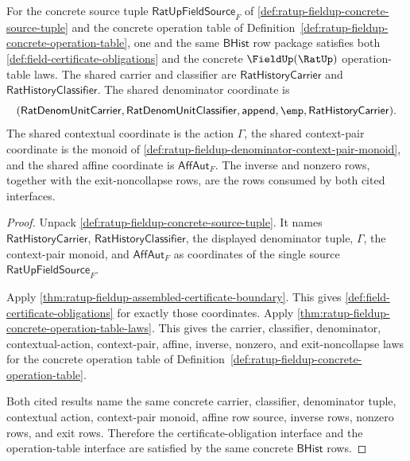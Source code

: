 \begin{theorem}
\label{thm:ratup-fieldup-assembled-certificate-operation-table-coverage}
For the concrete source tuple $\mathsf{RatUpFieldSource}_F$ of
\autoref{def:ratup-fieldup-concrete-source-tuple} and the concrete operation
table of Definition~\ref{def:ratup-fieldup-concrete-operation-table}, one and
the same $\mathsf{BHist}$ row package satisfies both
\autoref{def:field-certificate-obligations} and the concrete
$\FieldUp(\RatUp)$ operation-table laws. The shared carrier and classifier are
$\mathsf{RatHistoryCarrier}$ and $\mathsf{RatHistoryClassifier}$. The shared
denominator coordinate is
$$
(\mathsf{RatDenomUnitCarrier},\mathsf{RatDenomUnitClassifier},
\mathsf{append},\emp,\mathsf{RatHistoryCarrier}).
$$
The shared contextual coordinate is the action $\Gamma$, the shared
context-pair coordinate is the monoid of
\autoref{def:ratup-fieldup-denominator-context-pair-monoid}, and the shared
affine coordinate is $\mathsf{AffAut}_F$. The inverse and nonzero rows, together
with the exit-noncollapse rows, are the rows consumed by both cited interfaces.
\end{theorem}
\begin{proof}
Unpack \autoref{def:ratup-fieldup-concrete-source-tuple}. It names
$\mathsf{RatHistoryCarrier}$, $\mathsf{RatHistoryClassifier}$, the displayed
denominator tuple, $\Gamma$, the context-pair monoid, and
$\mathsf{AffAut}_F$ as coordinates of the single source
$\mathsf{RatUpFieldSource}_F$.

Apply \autoref{thm:ratup-fieldup-assembled-certificate-boundary}. This gives
\autoref{def:field-certificate-obligations} for exactly those coordinates.
Apply \autoref{thm:ratup-fieldup-concrete-operation-table-laws}. This gives the
carrier, classifier, denominator, contextual-action, context-pair, affine,
inverse, nonzero, and exit-noncollapse laws for the concrete operation table of
Definition~\ref{def:ratup-fieldup-concrete-operation-table}.

Both cited results name the same concrete carrier, classifier, denominator
tuple, contextual action, context-pair monoid, affine row source, inverse rows,
nonzero rows, and exit rows. Therefore the certificate-obligation interface and
the operation-table interface are satisfied by the same concrete
$\mathsf{BHist}$ rows.
\end{proof}
